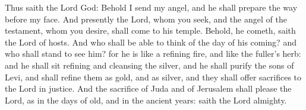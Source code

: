 
\bigskip





\bigskip





\bigskip






\bigskip







\bigskip





Thus saith the Lord God:
Behold I send my angel, and he shall prepare the way before my
face. And presently the Lord, whom you seek, and the angel of the
testament, whom you desire, shall come to his temple. Behold, he cometh,
saith the Lord of hosts.
And who shall be able to think of the day of his coming? and who
shall stand to see him? for he is like a refining fire, and like the
fuller's herb:
and he shall sit refining and cleansing the silver, and he shall
purify the sons of Levi, and shall refine them as gold, and as silver,
and they shall offer sacrifices to the Lord in justice.
And the sacrifice of Juda and of Jerusalem shall please the Lord,
as in the days of old, and in the ancient years:
saith the Lord almighty.

\columnbreak

